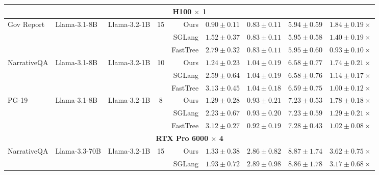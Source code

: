 \begin{table}
{\begin{tabular}{lllcrrrrr}
\midrule
\multicolumn{9}{c}{\textbf{H100 $\times$ 1}} \\
\midrule
\multirow{3}{*}{Gov Report}
  & \multirow{3}{*}{Llama-3.1-8B} & \multirow{3}{*}{Llama-3.2-1B} & \multirow{3}{*}{15}
  & Ours         & $\mathbf{0.90 \pm 0.11}$ & $0.83 \pm 0.11$ & $5.94 \pm 0.59$ & $\mathbf{1.84 \pm 0.19\times}$ \\
  & & & & SGLang       & $1.52 \pm 0.37$ & $0.83 \pm 0.11$ & $5.95 \pm 0.58$ & $1.40 \pm 0.19\times$ \\
  & & & & FastTree     & $2.79 \pm 0.32$ & $0.83 \pm 0.11$ & $5.95 \pm 0.60$ & $0.93 \pm 0.10\times$ \\
\midrule
\multirow{3}{*}{NarrativeQA}
  & \multirow{3}{*}{Llama-3.1-8B} & \multirow{3}{*}{Llama-3.2-1B} & \multirow{3}{*}{10}
  & Ours         & $\mathbf{1.24 \pm 0.23}$ & $1.04 \pm 0.19$ & $6.58 \pm 0.77$ & $\mathbf{1.74 \pm 0.21\times}$ \\
  & & & & SGLang       & $2.59 \pm 0.64$ & $1.04 \pm 0.19$ & $6.58 \pm 0.76$ & $1.14 \pm 0.17\times$ \\
  & & & & FastTree     & $3.13 \pm 0.45$ & $1.04 \pm 0.18$ & $6.59 \pm 0.75$ & $1.00 \pm 0.12\times$ \\
\midrule
\multirow{3}{*}{PG-19}
  & \multirow{3}{*}{Llama-3.1-8B} & \multirow{3}{*}{Llama-3.2-1B} & \multirow{3}{*}{8}
  & Ours         & $\mathbf{1.29 \pm 0.28}$ & $0.93 \pm 0.21$ & $7.23 \pm 0.53$ & $\mathbf{1.78 \pm 0.18\times}$ \\
  & & & & SGLang       & $2.23 \pm 0.67$ & $0.93 \pm 0.20$ & $7.23 \pm 0.59$ & $1.29 \pm 0.21\times$ \\
  & & & & FastTree     & $3.12 \pm 0.27$ & $0.92 \pm 0.19$ & $7.28 \pm 0.43$ & $1.02 \pm 0.08\times$ \\
\midrule
\multicolumn{9}{c}{\textbf{RTX Pro 6000 $\times$ 4}} \\
\midrule
\multirow{2}{*}{NarrativeQA}
  & \multirow{2}{*}{Llama-3.3-70B} & \multirow{2}{*}{Llama-3.2-1B} & \multirow{2}{*}{15}
  & Ours         & $\mathbf{1.33 \pm 0.38}$ & $2.86 \pm 0.82$ & $8.87 \pm 1.74$ & $\mathbf{3.62 \pm 0.75\times}$ \\
  & & & & SGLang       & $1.93 \pm 0.72$ & $2.89 \pm 0.98$ & $8.86 \pm 1.78$ & $3.17 \pm 0.68\times$ \\
\bottomrule
\end{tabular}%
}
\end{table}